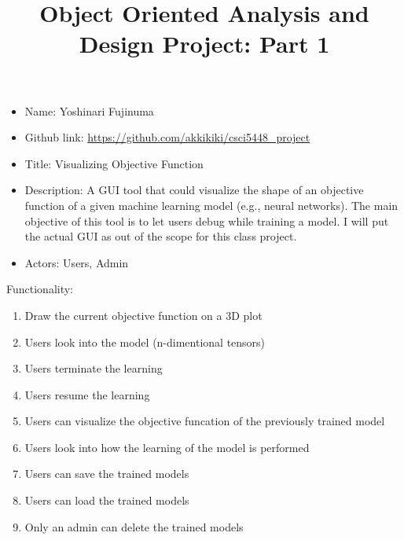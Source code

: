 \documentclass[11pt]{article}
\begin{document}
\vspace{-1cm}
\title{\vspace{-2ex} Object Oriented Analysis and Design Project: Part 1\vspace{-2ex}}
\date{\vspace{-6ex}}
\maketitle

\begin{itemize}
 \item Name: Yoshinari Fujinuma
 \item Github link: \url{https://github.com/akkikiki/csci5448_project}
 \item Title: Visualizing Objective Function
 \item Description: A GUI tool that could visualize the shape of an objective function of a given machine learning model (e.g., neural networks). The main objective of this tool is to let users debug while training a model. I will put the actual GUI as out of the scope for this class project. 
 \item Actors: Users, Admin
\end{itemize}

Functionality:
\begin{enumerate}[leftmargin=4\parindent]
 \item Draw the current objective function on a 3D plot
 \item Users look into the model (n-dimentional tensors)
 \item Users terminate the learning
 \item Users resume the learning
 \item Users can visualize the objective funcation of the previously trained model
 \item Users look into how the learning of the model is performed
 \item Users can save the trained models
 \item Users can load the trained models
 \item Only an admin can delete the trained models
\end{enumerate}

\end{document}
